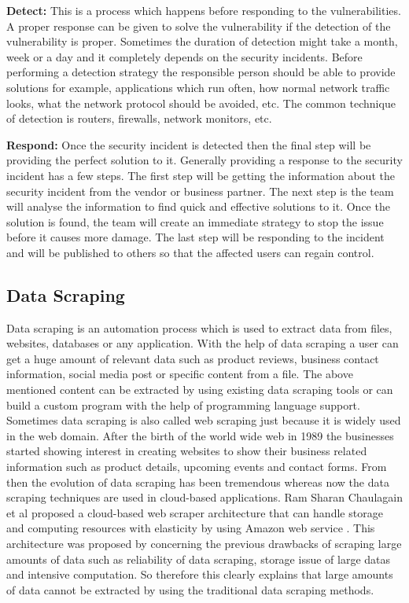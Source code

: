 	\textbf{Detect:} This is a process which happens before responding to the vulnerabilities. A proper response can be given to solve the vulnerability if the detection of the vulnerability is proper. Sometimes the duration of detection might take a month, week or a day and it completely depends on the security incidents. Before performing a detection strategy the responsible person should be able to provide solutions for example, applications which run often, how normal network traffic looks, what the network protocol should be avoided, etc. The common technique of detection is routers, firewalls, network monitors, etc.
	
	\textbf{Respond:} Once the security incident is detected then the final step will be providing the perfect solution to it. Generally providing a response to the security incident has a few steps. The first step will be getting the information about the security incident from the vendor or business partner. The next step is the team will analyse the information to find quick and effective solutions to it. Once the solution is found, the team will create an immediate strategy to stop the issue before it causes more damage. The last step will be responding to the incident and will be published to others so that the affected users can regain control.

\subsection{Data Scraping}
Data scraping is an automation process which is used to extract data from files, websites, databases or any application. With the help of data scraping a user can get a huge amount of relevant data such as product reviews, business contact information, social media post or specific content from a file. The above mentioned content can be extracted by using existing data scraping tools or can build a custom program with the help of programming language support. Sometimes data scraping is also called web scraping just because it is widely used in the web domain. After the birth of the world wide web in 1989 the businesses started showing interest in creating websites to show their business related information such as product details, upcoming events and contact forms. From then the evolution of data scraping has been tremendous whereas now the data scraping techniques are used in cloud-based applications. Ram Sharan Chaulagain et al proposed a cloud-based web scraper architecture that can handle storage and computing resources with elasticity by using Amazon web service \cite{SaBa2016}. This architecture was proposed by concerning the previous drawbacks of scraping large amounts of data such as reliability of data scraping, storage issue of large datas and intensive computation. So therefore this clearly explains that large amounts of data cannot be extracted by using the traditional data scraping methods.

